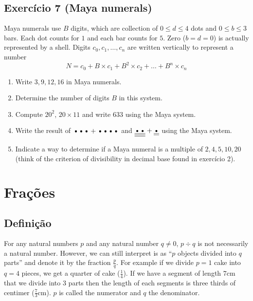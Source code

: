 \subsection*{Exercício 7 (Maya numerals)}

Maya numerals use $B$ digits, which are collection of $0 \leq d \leq 4$ dots and
$0 \leq b \leq 3$ bars. Each dot counts for $1$ and each bar counts for $5$.
Zero ($b=d=0$) is actually represented by a shell. Digits
$c_0, c_1, \ldots, c_n$ are written vertically to represent a number
$$N = c_0 + B \times c_1 + B^2 \times c_2 + \ldots + B^n \times c_n$$

\begin{enumerate}
\item Write $3, 9, 12, 16$ in Maya numerals.
\item Determine the number of digits $B$ in this system.
\item Compute $20^2$, $20\times11$ and write $633$ using the Maya system.
\item Write the result of
  $\text{\textbullet\textbullet\textbullet} +
  \text{\textbullet\textbullet\textbullet\textbullet}$
  and
  ${\underline{\underline{\underline{\text{\textbullet\textbullet}}}}} +
  {\underline{\underline{\text{\textbullet}}}}$
  using the Maya system.
\item Indicate a way to determine if a Maya numeral is a multiple
  of $2,4,5,10,20$ (think of the
  criterion of divisibility in decimal base found in exercício 2).
\end{enumerate}

\section{Frações}

\subsection*{Definição}

For any natural numbers $p$ and any natural number $q\neq0$, $p \div q$ is
not necessarily a natural number. However, we can still interpret is as
``$p$ objects divided into $q$ parts'' and denote it by the fraction
$\frac{p}{q}$. For example if we divide $p=1$ cake
into $q=4$ pieces, we get a quarter of cake ($\frac{1}{4}$). If we have a
segment of length $7\text{cm}$ that we divide into $3$ parts then the length
of each segments is three thirds of centimer ($\frac{7}{3} \text{cm}$).
$p$ is called the numerator and $q$ the denominator.

